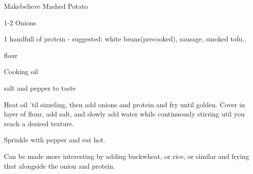 \begin{recipe}{Makebelieve Mashed Potato}
    \begin{ingr}[1-2]
    \item 1-2 Onions
    \item 1 handfull of protein - suggested: white beans(precooked),
        sausage, smoked tofu..
    \item flour
    \item Cooking oil
    \item salt and pepper to taste
    \end{ingr}

    Heat oil 'til sizzeling, then add onions and protein and fry until golden.
    Cover in layer of flour, add salt, and slowly add water while
    continuously stirring util
    you reach a desired texture.

    Sprinkle with pepper and eat hot.

    Can be made more interesting by adding buckwheat, or rice, or
    similar and frying
    that alongside the onion and protein.
\end{recipe}
